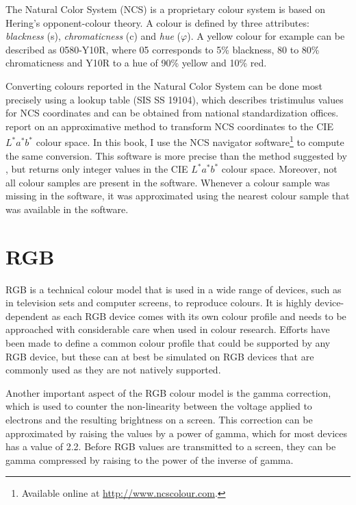 The Natural Color System (NCS) is a proprietary colour system is based on 
Hering's opponent-colour theory. A colour is defined by three attributes:
\emph{blackness} (s), \emph{chromaticness} (c) and \emph{hue}
($\varphi$). A yellow colour for example can be described as 0580-Y10R,
where 05 corresponds to 5\% blackness, 80 to 80\% chromaticness and
Y10R to a hue of 90\% yellow and 10\% red.

Converting colours reported in the Natural Color System can be done
most precisely using a lookup table (SIS SS 19104), which describes
tristimulus values for NCS coordinates and can be obtained from national
standardization offices. \cite{derefeldt86transformation} report on an
approximative method to transform NCS coordinates to the CIE
$L^*a^*b^*$ colour space. In this book, I use the NCS navigator 
software\footnote{Available online at \url{http://www.ncscolour.com}.}
to compute the same conversion. This software is more precise 
than the method suggested by \cite{derefeldt86transformation}, but returns 
only integer values in the CIE $L^*a^*b^*$ colour space. Moreover, not all
colour samples are present in the software. Whenever a colour sample\enlargethispage{\baselineskip}
was missing in the software, it was approximated using the nearest
colour sample that was available in the software.

\section{RGB}
\label{s:RGB}

RGB is a technical colour model that is used in a wide range of
devices, such as in television sets and computer screens, to reproduce
colours. It is highly device-dependent as each RGB device comes with
its own colour profile and needs to be approached with considerable
care when used in colour research. Efforts have been made to define a
common colour profile that could be supported by any RGB device, but
these can at best be simulated on RGB devices that are commonly used
as they are not natively supported.

Another important aspect of the RGB colour model is the gamma
correction, which is used to counter the non-linearity between the
voltage applied to electrons and the resulting brightness on a
screen. This correction can be approximated by raising the values by a
power of gamma, which for most devices has a value of 2.2. Before RGB
values are transmitted to a screen, they can be gamma compressed by
raising to the power of the inverse of gamma.

